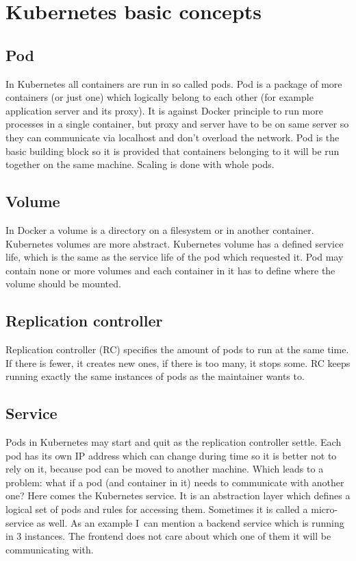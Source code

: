 \chapter{Kubernetes basic concepts}\label{chapter:kubernetes-basic-concepts}

\section{Pod}
In Kubernetes all containers are run in so called pods. Pod is a package of more containers (or just one) which logically belong to each other (for example application server and its proxy). It is against Docker principle to run more processes in a single container, but proxy and server have to be on same server so they can communicate via localhost and don’t overload the network. Pod is the basic building block so it is provided that containers belonging to it will be run together on the same machine. Scaling is done with whole pods.

\section{Volume}
In Docker a volume is a directory on a filesystem or in another container. Kubernetes volumes are more abstract. Kubernetes volume has a defined service life, which is the same as the service life of the pod which requested it. Pod may contain none or more volumes and each container in it has to define where the volume should be mounted.

\section{Replication controller}
Replication controller (RC) specifies the amount of pods to run at the same time. If there is fewer, it creates new ones, if there is too many, it stops some. RC keeps running exactly the same instances of pods as the maintainer wants to. 

\section{Service}
Pods in Kubernetes may start and quit as the replication controller settle. Each pod has its own IP address which can change during time so it is better not to rely on it, because pod can be moved to another machine. Which leads to a problem: what if a pod (and container in it) needs to communicate with another one? Here comes the Kubernetes service. It is an abstraction layer which defines a logical set of pods and rules for accessing them. Sometimes it is called a micro-service as well. As an example I~can mention a backend service which is running in 3 instances. The frontend does not care about which one of them it will be communicating with.
